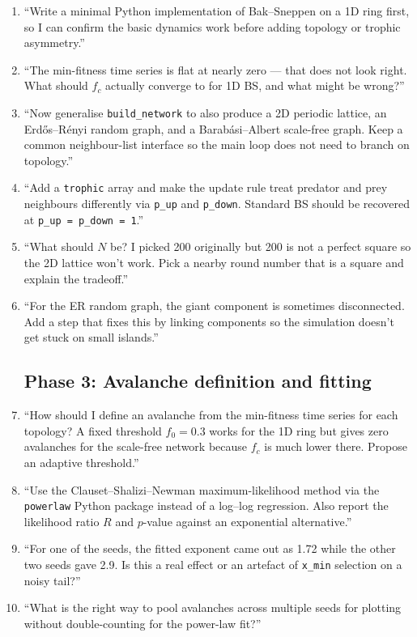 \documentclass[10pt,a4paper,twocolumn]{article}
\begin{document}
\begin{enumerate}
\subsection*{Phase 2: Simulator construction}
\item ``Write a minimal Python implementation of Bak--Sneppen on a 1D ring first, so I can confirm the basic dynamics work before adding topology or trophic asymmetry.''
\item ``The min-fitness time series is flat at nearly zero --- that does not look right. What should $f_c$ actually converge to for 1D BS, and what might be wrong?''
\item ``Now generalise \texttt{build\_network} to also produce a 2D periodic lattice, an Erd\H{o}s--R\'enyi random graph, and a Barab\'asi--Albert scale-free graph. Keep a common neighbour-list interface so the main loop does not need to branch on topology.''
\item ``Add a \texttt{trophic} array and make the update rule treat predator and prey neighbours differently via \texttt{p\_up} and \texttt{p\_down}. Standard BS should be recovered at \texttt{p\_up = p\_down = 1}.''
\item ``What should $N$ be? I picked 200 originally but 200 is not a perfect square so the 2D lattice won't work. Pick a nearby round number that is a square and explain the tradeoff.''
\item ``For the ER random graph, the giant component is sometimes disconnected. Add a step that fixes this by linking components so the simulation doesn't get stuck on small islands.''

\subsection*{Phase 3: Avalanche definition and fitting}
\item ``How should I define an avalanche from the min-fitness time series for each topology? A fixed threshold $f_0 = 0.3$ works for the 1D ring but gives zero avalanches for the scale-free network because $f_c$ is much lower there. Propose an adaptive threshold.''
\item ``Use the Clauset--Shalizi--Newman maximum-likelihood method via the \texttt{powerlaw} Python package instead of a log--log regression. Also report the likelihood ratio $R$ and $p$-value against an exponential alternative.''
\item ``For one of the seeds, the fitted exponent came out as 1.72 while the other two seeds gave 2.9. Is this a real effect or an artefact of \texttt{x\_min} selection on a noisy tail?''
\item ``What is the right way to pool avalanches across multiple seeds for plotting without double-counting for the power-law fit?''


\end{enumerate}
\end{document}
